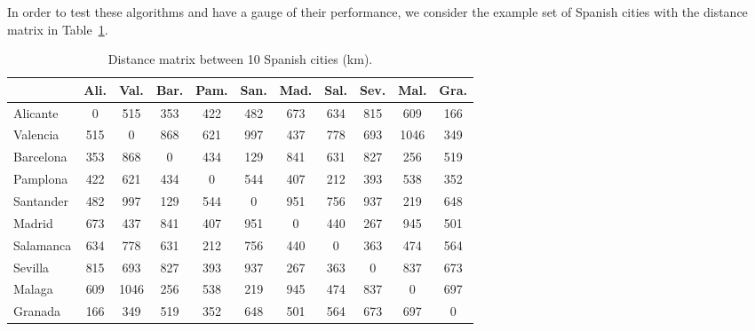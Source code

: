 \documentclass[a4paper, 11pt]{article}
\begin{document}
In order to test these algorithms and have a gauge of their performance, we consider the example set of Spanish cities with the  distance matrix in Table~\ref{tab:distance_matrix}.

\begin{table}[hbt]
	\begin{center}
		\begin{tabular}{|l|cccccccccc|}
			\cline{2-11}
			\multicolumn{1}{c|}{} & Ali.   & Val.  & Bar. & Pam. & San. & Mad. & Sal. & Sev. & Mal.  & Gra. \\
			\hline 
			Alicante	& 0   & 515  & 353 & 422 & 482 & 673 & 634 & 815 & 609  & 166 \\
			Valencia    & 515 & 0    & 868 & 621 & 997 & 437 & 778 & 693 & 1046 & 349 \\
			Barcelona	& 353 & 868  & 0   & 434 & 129 & 841 & 631 & 827 & 256  & 519 \\
			Pamplona	& 422 & 621  & 434 & 0   & 544 & 407 & 212 & 393 & 538  & 352 \\
			Santander	& 482 & 997  & 129 & 544 & 0   & 951 & 756 & 937 & 219  & 648 \\
			Madrid		& 673 & 437  & 841 & 407 & 951 & 0   & 440 & 267 & 945  & 501 \\
			Salamanca	& 634 & 778  & 631 & 212 & 756 & 440 & 0   & 363 & 474  & 564 \\
			Sevilla		& 815 & 693  & 827 & 393 & 937 & 267 & 363 & 0   & 837  & 673 \\
			Malaga		& 609 & 1046 & 256 & 538 & 219 & 945 & 474 & 837 & 0    & 697 \\
			Granada		& 166 & 349  & 519 & 352 & 648 & 501 & 564 & 673 & 697  & 0   \\
			\hline 
		\end{tabular}
		\caption{Distance matrix between 10 Spanish cities (km).}
		\label{tab:distance_matrix}
	\end{center}
\end{table}


\clearpage

\end{document}
